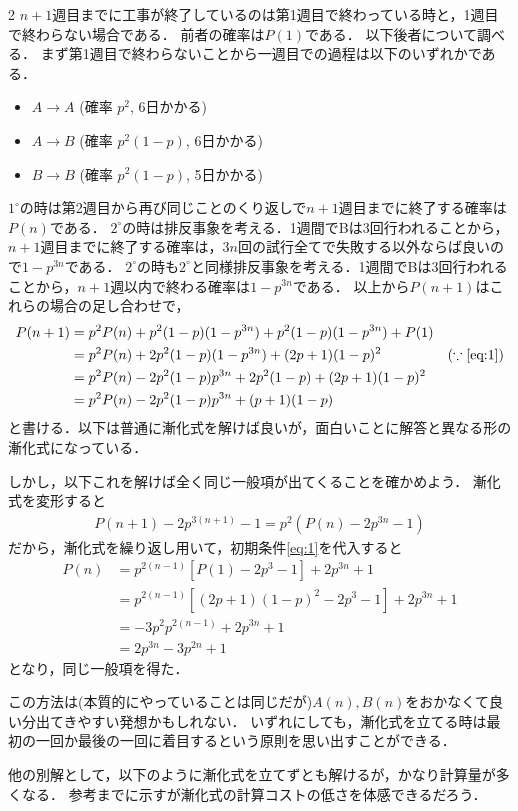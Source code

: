 \documentclass[../../main.tex]{subfiles}
\begin{document}
\begin{multicols}{2}
  $n+1$週目までに工事が終了しているのは第1週目で終わっている時と，1週目で終わらない場合である．
  前者の確率は$P(1)$である．
  以下後者について調べる．
  まず第1週目で終わらないことから一週目での過程は以下のいずれかである．
  \begin{itemize}
    \item[$1^{\circ}$] $A \to A$ (確率 $p^2$, 6日かかる)
    \item[$2^{\circ}$] $A \to B$ (確率 $p^2(1-p)$, 6日かかる)
    \item[$3^{\circ}$] $B \to B$ (確率 $p^2(1-p)$, 5日かかる)
  \end{itemize}
  $1^{\circ}$の時は第2週目から再び同じことのくり返しで$n+1$週目までに終了する確率は$P(n)$である．
  $2^{\circ}$の時は排反事象を考える．1週間でBは3回行われることから，$n+1$週目までに終了する確率は，$3n$回の試行全てで失敗する以外ならば良いので$1-p^{3n}$である．
  $2^{\circ}$の時も$2^{\circ}$と同様排反事象を考える．1週間でBは3回行われることから，$n+1$週以内で終わる確率は$1-p^{3n}$である．
  以上から$P(n+1)$はこれらの場合の足し合わせで，
  \begin{align}
    P(n+1)
    & = p^2 P(n) + p^2(1-p)(1-p^{3n}) + p^2(1-p)(1-p^{3n}) + P(1) &                                      \\
    & = p^2 P(n) + 2p^2(1-p)(1-p^{3n}) + (2p+1)(1-p)^2            & (\because \text{\cref{eq:1}}) \\
    & = p^2 P(n) - 2p^2(1-p)p^{3n} + 2p^2(1-p) + (2p+1)(1-p)^2    &                                      \\
    & = p^2 P(n) - 2p^2(1-p)p^{3n} + (p+1)(1-p)                   &
  \end{align}
  と書ける．以下は普通に漸化式を解けば良いが，面白いことに解答と異なる形の漸化式になっている．

  しかし，以下これを解けば全く同じ一般項が出てくることを確かめよう．
  漸化式を変形すると
  \begin{align}
    P(n+1) - 2p^{3(n+1)}-1 = p^2\left(P(n)-2p^{3n}-1\right)
  \end{align}
  だから，漸化式を繰り返し用いて，初期条件\cref{eq:1}を代入すると
  \begin{align}
    P(n)
    & = p^{2(n-1)}\left[P(1)-2p^{3}-1\right] + 2p^{3n} + 1           \\
    & = p^{2(n-1)}\left[(2p+1)(1-p)^2 -2p^{3}-1\right] + 2p^{3n} + 1 \\
    & = -3p^2p^{2(n-1)}+ 2p^{3n} + 1                                 \\
    & = 2p^{3n} -3p^{2n}+  1
  \end{align}
  となり，同じ一般項を得た．

  この方法は(本質的にやっていることは同じだが)$A(n),B(n)$をおかなくて良い分出てきやすい発想かもしれない．
  いずれにしても，漸化式を立てる時は最初の一回か最後の一回に着目するという原則を思い出すことができる．

  他の別解として，以下のように漸化式を立てずとも解けるが，かなり計算量が多くなる．
  参考までに示すが漸化式の計算コストの低さを体感できるだろう．

  \newpage
\end{multicols}
\end{document}
